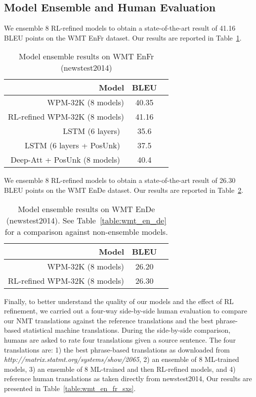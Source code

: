 \subsection{Model Ensemble and Human Evaluation}
We ensemble 8 RL-refined models to obtain a state-of-the-art
result of 41.16 BLEU points on the WMT EnFr dataset. Our results are
reported in Table~\ref{table:ensemble-wmt_en_fr}.
\begin{table}[h!]
\caption{Model ensemble results on WMT EnFr (newstest2014)}
\label{table:ensemble-wmt_en_fr}
\centering
\begin{tabular}{r c c }
\hline\hline Model                                                             & BLEU        \\
       \hline
       WPM-32K (8 models)                                                & 40.35 \\
       RL-refined WPM-32K (8 models)                                     & 41.16 \\ \hline
       LSTM (6 layers)~\cite{luong2015addressing}                        & 35.6 \\
       LSTM (6 layers + PosUnk)~\cite{luong2015addressing}               & 37.5 \\
       Deep-Att + PosUnk (8 models)~\cite{DBLP:journals/corr/ZhouCWLX16} & 40.4 \\
\hline \end{tabular}
\end{table}

We ensemble 8 RL-refined models to obtain a state-of-the-art
result of 26.30 BLEU points on the WMT EnDe dataset. Our results are
reported in Table~\ref{table:ensemble-wmt_en_de}.
\begin{table}[h!]
\caption{Model ensemble results on WMT EnDe (newstest2014). See Table~\ref{table:wmt_en_de} for a comparison against non-ensemble models.}
\label{table:ensemble-wmt_en_de}
\centering
\begin{tabular}{r c c }
\hline\hline Model                                                             & BLEU        \\
       \hline
       WPM-32K (8 models)                                                & 26.20 \\
       RL-refined WPM-32K (8 models)                                     & 26.30 \\
\hline \end{tabular}
\end{table}

Finally, to better understand the quality of our models and the effect
of RL refinement, we carried out a four-way side-by-side human
evaluation to compare our NMT translations against the reference translations
and the best phrase-based statistical machine translations.
During the side-by-side comparison,
humans are asked to rate four translations given a source sentence.
The four translations are:
1) the best phrase-based translations as downloaded
from \textsl{http://matrix.statmt.org/systems/show/2065},
2) an ensemble of 8 ML-trained models,
3) an ensemble of 8 ML-trained and then RL-refined models, and
4) reference human translations as taken directly from newstest2014,
Our results are presented in Table~\ref{table:wmt_en_fr_sxs}.

